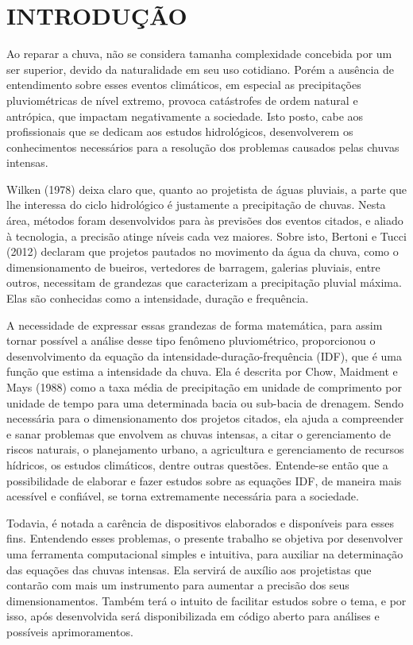 \onehalfspacing
\chapter{INTRODUÇÃO}

Ao reparar a chuva, não se considera tamanha complexidade concebida por um ser superior, devido da naturalidade em seu uso cotidiano. Porém a ausência de entendimento sobre esses eventos climáticos, em especial as precipitações pluviométricas de nível extremo, provoca catástrofes de ordem natural e antrópica, que impactam negativamente a sociedade. Isto posto, cabe aos profissionais que se dedicam aos estudos hidrológicos, desenvolverem os conhecimentos necessários para a resolução dos problemas causados pelas chuvas intensas.

Wilken (1978) deixa claro que, quanto ao projetista de águas pluviais, a parte que lhe interessa do ciclo hidrológico é justamente a precipitação de chuvas. Nesta área, métodos foram desenvolvidos para às previsões dos eventos citados, e aliado à tecnologia, a precisão atinge níveis cada vez maiores. Sobre isto, Bertoni e Tucci (2012) declaram que projetos pautados no movimento da água da chuva, como o dimensionamento de bueiros, vertedores de barragem, galerias pluviais, entre outros, necessitam de grandezas que caracterizam a precipitação pluvial máxima. Elas são conhecidas como a intensidade, duração e frequência.

A necessidade de expressar essas grandezas de forma matemática, para assim tornar possível a análise desse tipo fenômeno pluviométrico, proporcionou o desenvolvimento da equação da intensidade-duração-frequência (IDF), que é uma função que estima a intensidade da chuva. Ela é descrita por Chow, Maidment e Mays (1988) como a taxa média de precipitação em unidade de comprimento por unidade de tempo para uma determinada bacia ou sub-bacia de drenagem. Sendo necessária para o dimensionamento dos projetos citados, ela ajuda a compreender e sanar problemas que envolvem as chuvas intensas, a citar o gerenciamento de riscos naturais, o planejamento urbano, a agricultura e gerenciamento de recursos hídricos, os estudos climáticos, dentre outras questões. Entende-se então que a possibilidade de elaborar e fazer estudos sobre as equações IDF, de maneira mais acessível e confiável, se torna extremamente necessária para a sociedade. 

Todavia, é notada a carência de dispositivos elaborados e disponíveis para esses fins. Entendendo esses problemas, o presente trabalho se objetiva por desenvolver uma ferramenta computacional simples e intuitiva, para auxiliar na determinação das equações das chuvas intensas. Ela servirá de auxílio aos projetistas que contarão com mais um instrumento para aumentar a precisão dos seus dimensionamentos. Também terá o intuito de facilitar estudos sobre o tema, e por isso, após desenvolvida será disponibilizada em código aberto para análises e possíveis aprimoramentos.
